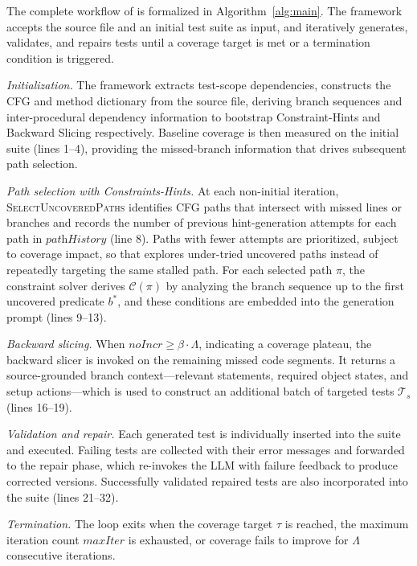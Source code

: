 The complete workflow of \ourmethod{} is formalized in Algorithm~\ref{alg:main}. The framework accepts the source file and an initial test suite as input, and iteratively generates, validates, and repairs tests until a coverage target is met or a termination condition is triggered.


{\em Initialization.}
The framework extracts test-scope dependencies, constructs the CFG and method dictionary from the source file, deriving branch sequences and inter-procedural dependency information to bootstrap Constraint-Hints and Backward Slicing respectively. Baseline coverage is then measured on the initial suite (lines 1--4), providing the missed-branch information that drives subsequent path selection.

{\em Path selection with Constraints-Hints.}
At each non-initial iteration, \textsc{SelectUncoveredPaths} identifies CFG paths that intersect with missed lines or branches and records the number of previous hint-generation attempts for each path in $\textit{pathHistory}$ (line 8). Paths with fewer attempts are prioritized, subject to coverage impact, so that \ourmethod{} explores under-tried uncovered paths instead of repeatedly targeting the same stalled path. For each selected path $\pi$, the constraint solver derives $\mathcal{C}(\pi)$ by analyzing the branch sequence up to the first uncovered predicate $b^*$, and these conditions are embedded into the generation prompt (lines 9--13).

{\em Backward slicing.}
When $\textit{noIncr} \geq \beta \cdot \Lambda$, indicating a coverage plateau, the backward slicer is invoked on the remaining missed code segments. It returns a source-grounded branch context---relevant statements, required object states, and setup actions---which is used to construct an additional batch of targeted tests $\mathcal{T}_s$ (lines 16--19).

{\em Validation and repair.}
Each generated test is individually inserted into the suite and executed. Failing tests are collected with their error messages and forwarded to the repair phase, which re-invokes the LLM with failure feedback to produce corrected versions. Successfully validated repaired tests are also incorporated into the suite (lines 21--32).

{\em Termination.}
The loop exits when the coverage target $\tau$ is reached, the maximum iteration count $\textit{maxIter}$ is exhausted, or coverage fails to improve for $\Lambda$ consecutive iterations.
